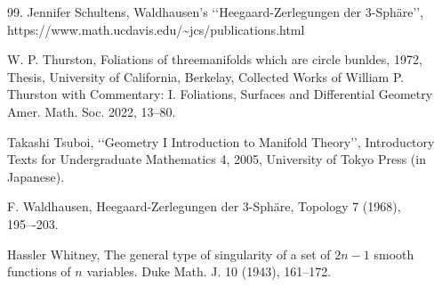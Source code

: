\documentclass{amsart}
\numberwithin{equation}{section}
\begin{document}
\begin{thebibliography}{99.}
 Jennifer Schultens,
Waldhausen's \lq\lq{}Heegaard-Zerlegungen der 3-Sph\"are\rq\rq, 
https://www.math.ucdavis.edu/\textasciitilde jcs/publications.html

W. P. Thurston,  
Foliations of threemanifolds which are circle bunldes, 1972, Thesis, University of California, Berkelay, Collected Works of William P. Thurston with Commentary: I. Foliations, Surfaces and Differential Geometry Amer. Math. Soc. 2022, 13--80.

 Takashi Tsuboi, \lq\lq{}Geometry I Introduction to Manifold Theory\rq\rq, Introductory Texts for Undergraduate Mathematics 4, 2005, University of Tokyo Press (in Japanese). 

 F. Waldhausen, Heegaard-Zerlegungen der 3-Sph\"are, Topology 7 (1968), 195–-203.

Hassler Whitney, The general type of singularity of a set of $2n-1$ smooth functions of $n$ variables. Duke Math. J. 10 (1943), 161–172. 
\end{thebibliography}
\end{document}
